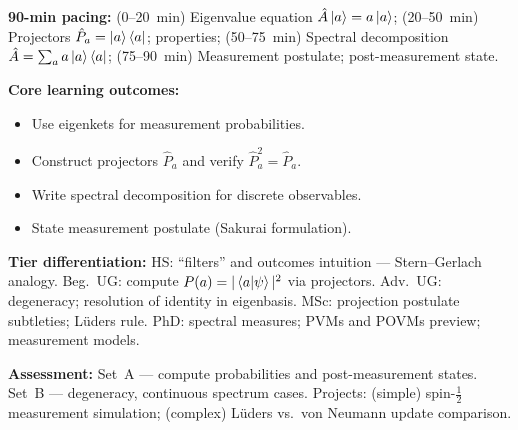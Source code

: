 \documentclass[11pt,a4paper]{article}
\begin{document}
\medskip
\begin{tcolorbox}[modulebox, title={Module~I.2 / L04: Eigenkets, Projectors \& Spectral Decomposition}]
\textbf{90-min pacing:} (0--20~min) Eigenvalue equation $\hat{A}\ket{a}=a\ket{a}$;
(20--50~min) Projectors $\hat{P}_a=\ket{a}\bra{a}$; properties;
(50--75~min) Spectral decomposition $\hat{A}=\sum_a a\ket{a}\bra{a}$;
(75--90~min) Measurement postulate; post-measurement state.

\medskip\textbf{Core learning outcomes:}
\begin{itemize}[leftmargin=1.4em,topsep=2pt,itemsep=1pt]
  \item Use eigenkets for measurement probabilities.
  \item Construct projectors $\hat{P}_a$ and verify $\hat{P}_a^2=\hat{P}_a$.
  \item Write spectral decomposition for discrete observables.
  \item State measurement postulate (Sakurai formulation).
\end{itemize}

\medskip\textbf{Tier differentiation:}
HS: ``filters'' and outcomes intuition --- Stern--Gerlach analogy.
Beg.\ UG: compute $P(a)=|\braket{a|\psi}|^2$ via projectors.
Adv.\ UG: degeneracy; resolution of identity in eigenbasis.
MSc: projection postulate subtleties; L\"uders rule.
PhD: spectral measures; PVMs and POVMs preview; measurement models.

\medskip\textbf{Assessment:}
Set~A --- compute probabilities and post-measurement states.
Set~B --- degeneracy, continuous spectrum cases.
Projects: (simple) spin-$\tfrac{1}{2}$ measurement simulation; (complex) L\"uders vs.\ von Neumann update comparison.
\end{tcolorbox}
\end{document}
